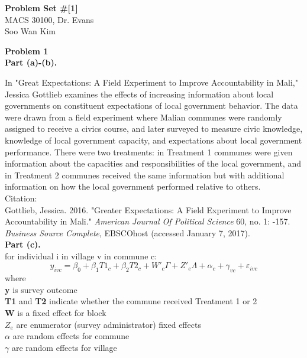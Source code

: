 \documentclass[letterpaper,12pt]{article}
\theoremstyle{definition}
\begin{document}
\begin{flushleft}
  \textbf{\large{Problem Set \#[1]}} \\
  MACS 30100, Dr. Evans \\
  Soo Wan Kim
\end{flushleft}

\noindent\textbf{Problem 1} \\
\textbf {Part (a)-(b).} \\

\noindent

In "Great Expectations: A Field Experiment to Improve Accountability in Mali," Jessica Gottlieb examines the effects of increasing information about local governments on constituent expectations of local government behavior. The data were drawn from a field experiment where Malian communes were randomly assigned to receive a civics course, and later surveyed to measure civic knowledge, knowledge of local government capacity, and expectations about local government performance. There were two treatments: in Treatment 1 communes were given information about the capacities and responsibilities of the local government, and in Treatment 2 communes received the same information but with additional information on how the local government performed relative to others. \\

\noindent
Citation: \\
\noindent
Gottlieb, Jessica. 2016. "Greater Expectations: A Field Experiment to Improve
\indent\indent
Accountability in Mali." \textit{American Journal Of Political Science} 60, no. 1: 
\indent{}-157. \textit{Business Source Complete}, EBSCOhost (accessed January 7, 2017).\\

\noindent\textbf {Part (c).} \\
for individual i in village v in commune c:
\[y_{ivc} = \beta_0 + \beta_1T1_c + \beta_2T2_c + W'_c\Gamma + Z'_e\Lambda + \alpha_c + \gamma_{vc} + \varepsilon_{ivc} \]
\noindent
where \\
\indent
\textbf{y} is survey outcome \\
\indent
\textbf{T1} and \textbf{T2} indicate whether the commune received Treatment 1 or 2 \\
\indent
\textbf{W} is a fixed effect for block \\
\indent
\textbf{\(Z_e \)} are enumerator (survey administrator) fixed effects \\
\indent
\textbf{\(\alpha\)} are random effects for commune \\
\indent
\textbf{\(\gamma\)} are random effects for village \\
\end{document}
